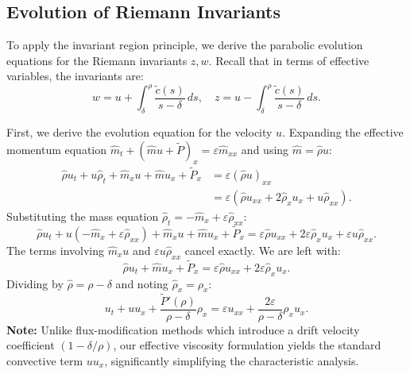 \documentclass[12pt, reqno]{article}
\theoremstyle{definition}
\numberwithin{equation}{section}
\begin{document}
\subsection{Evolution of Riemann Invariants}

To apply the invariant region principle, we derive the parabolic evolution equations for the Riemann invariants $z, w$. Recall that in terms of effective variables, the invariants are:
\begin{equation}
    w = u + \int_{\delta}^{\rho} \frac{\tilde{c}(s)}{s-\delta} \, ds, \quad z = u - \int_{\delta}^{\rho} \frac{\tilde{c}(s)}{s-\delta} \, ds.
\end{equation}

First, we derive the evolution equation for the velocity $u$. Expanding the effective momentum equation $\hat{m}_t + (\hat{m}u + \tilde{P})_x = \varepsilon \hat{m}_{xx}$ and using $\hat{m} = \hat{\rho} u$:
\begin{align*}
    \hat{\rho} u_t + u \hat{\rho}_t + \hat{m}_x u + \hat{m} u_x + \tilde{P}_x &= \varepsilon (\hat{\rho} u)_{xx} \\
    &= \varepsilon (\hat{\rho} u_{xx} + 2\hat{\rho}_x u_x + u \hat{\rho}_{xx}).
\end{align*}
Substituting the mass equation $\hat{\rho}_t = -\hat{m}_x + \varepsilon \hat{\rho}_{xx}$:
\[
    \hat{\rho} u_t + u (-\hat{m}_x + \varepsilon \hat{\rho}_{xx}) + \hat{m}_x u + \hat{m} u_x + \tilde{P}_x = \varepsilon \hat{\rho} u_{xx} + 2\varepsilon \hat{\rho}_x u_x + \varepsilon u \hat{\rho}_{xx}.
\]
The terms involving $\hat{m}_x u$ and $\varepsilon u \hat{\rho}_{xx}$ cancel exactly. We are left with:
\[
    \hat{\rho} u_t + \hat{m} u_x + \tilde{P}_x = \varepsilon \hat{\rho} u_{xx} + 2\varepsilon \hat{\rho}_x u_x.
\]
Dividing by $\hat{\rho} = \rho-\delta$ and noting $\hat{\rho}_x = \rho_x$:
\begin{equation}\label{eq:u_viscous}
    u_t + u u_x + \frac{\tilde{P}'(\rho)}{\rho-\delta}\rho_x = \varepsilon u_{xx} + \frac{2\varepsilon}{\rho-\delta}\rho_x u_x.
\end{equation}
\textbf{Note:} Unlike flux-modification methods which introduce a drift velocity coefficient $(1-\delta/\rho)$, our effective viscosity formulation yields the standard convective term $u u_x$, significantly simplifying the characteristic analysis.
\end{document}
